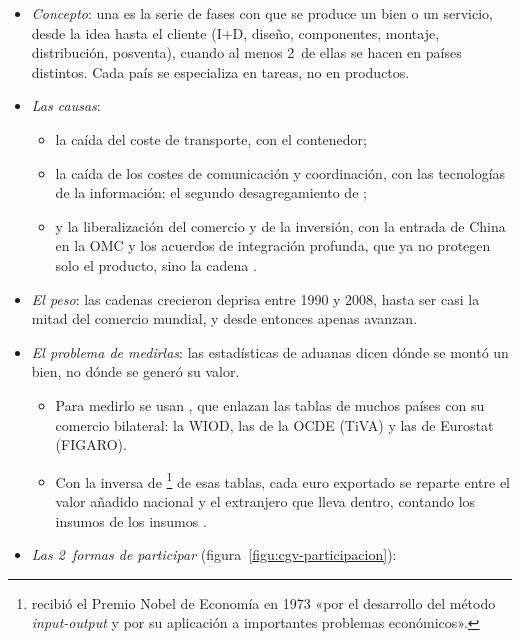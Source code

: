 \documentclass[11pt]{article}
\begin{document}
\begin{itemize}
\item \emph{Concepto}: una  es la serie de fases con que se produce un bien o un servicio, desde la idea hasta el cliente (I+D, diseño, componentes, montaje, distribución, posventa), cuando al menos 2~de ellas se hacen en países distintos\nocite{BM2020WDR}. Cada país se especializa en tareas, no en productos.
\item \emph{Las causas}:
  \begin{itemize}
  \item la caída del coste de transporte, con el contenedor\nocite{Bernhofen2016Container};
  \item la caída de los costes de comunicación y coordinación, con las tecnologías de la información: el segundo desagregamiento de \textcite{Baldwin2016Convergence};
  \item y la liberalización del comercio y de la inversión, con la entrada de China en la OMC y los acuerdos de integración profunda, que ya no protegen solo el producto, sino la cadena .
  \end{itemize}
\item \emph{El peso}: las cadenas crecieron deprisa entre 1990 y 2008, hasta ser casi la mitad del comercio mundial, y desde entonces apenas avanzan\nocite{BM2020WDR}.
\item \emph{El problema de medirlas}: las estadísticas de aduanas dicen dónde se montó un bien, no dónde se generó su valor.
  \begin{itemize}
  \item Para medirlo se usan , que enlazan las tablas de muchos países con su comercio bilateral: la WIOD\nocite{Timmer2015WIOD}, las de la OCDE (TiVA) y las de Eurostat (FIGARO)\nocite{OCDE2025TiVA,Eurostat2026FIGAROcgv}.
  \item Con la inversa de \footnote{ recibió el Premio Nobel de Economía en 1973 «por el desarrollo del método \emph{input-output} y por su aplicación a importantes problemas económicos»\nocite{Nobel1973Leontief}.} de esas tablas, cada euro exportado se reparte entre el valor añadido nacional y el extranjero que lleva dentro, contando los insumos de los insumos\nocite{HummelsIshiiYi2001,JohnsonNoguera2012,KoopmanWangWei2014} .
  \end{itemize}
\item \emph{Las 2~formas de participar} (figura~\ref{figu:cgv-participacion}):

\end{itemize}
\end{document}
